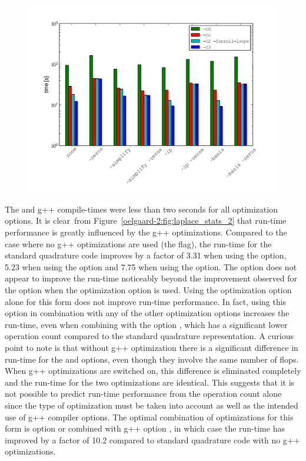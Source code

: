\begin{figure}
          {\includegraphics[width=\mediumfullfig]{chapters/oelgaard-2/pdf/runtime_laplace.pdf}}
\end{figure}

The \ffc{} and g++ compile-times were less than two seconds for all
optimization options.  It is clear~from
Figure~\ref{oelgaard-2:fig:laplace_stats_2} that run-time performance
is greatly influenced by the g++ optimizations.  \hbox{Compared} to the case
where no g++ optimizations are used (the  flag), the run-time
for the standard quadrature code improves by a factor of 3.31 when
using the  option, 5.23 when using the  option and  7.75 when using the  option.
The  option does not appear to
improve the run-time noticeably beyond the improvement observed for the
 option when the \ffc{} optimization option
 is used.  Using the \ffc{} optimization option
 alone for this form does not improve run-time performance.
In fact, using this option in combination with any of the other
optimization options increases the run-time, even when combining with
the option , which has a significant lower operation
count compared to the standard quadrature representation.  A curious
point to note is that without g++ optimization there is a significant
difference in run-time for the  and  options, even
though they involve the same number of flops.  When g++ optimizations
are switched on, this difference is eliminated completely and the
run-time for the two \ffc{} optimizations are identical.  This suggests
that it is not possible to predict run-time performance from the
operation count alone since the type of \ffc{} optimization must be
taken into account as well as the intended use of g++ compiler
options.  The optimal combination of optimizations for this form is
\ffc{} option  or  combined with g++ option
, in which case the run-time has improved by a
factor of 10.2 compared to standard quadrature code with no g++
optimizations.

